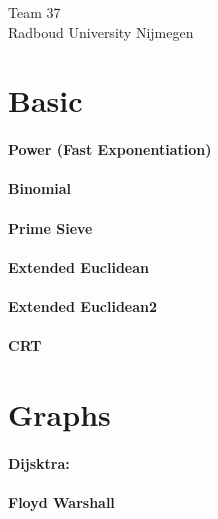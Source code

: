 \documentclass[a4paper]{article}
\begin{document}
\null\vfill
\begin{center}
{\huge Team 37}\\
\vspace{10cm}
{\large Radboud University Nijmegen}
\end{center}
\vfill
\thispagestyle{empty} %
\newpage

\clearpage
\setcounter{page}{1}


\section{Basic} 
\paragraph{Power (Fast Exponentiation)} \hfill

\paragraph{Binomial} \hfill

\paragraph{Prime Sieve} \hfill

\paragraph{Extended Euclidean} \hfill

\paragraph{Extended Euclidean2} \hfill

\paragraph{CRT} \hfill

\section{Graphs}
\paragraph{Dijsktra:} \hfill

\paragraph{Floyd Warshall} \hfill

\end{document}
